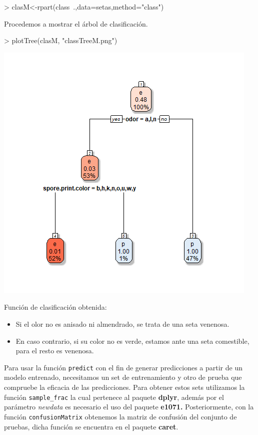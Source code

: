 \documentclass [a4paper] {article}
\begin{document}
\bigskip
\begin{Schunk}
\begin{Sinput}
> clasM<-rpart(class~.,data=setas,method="class")
\end{Sinput}
\end{Schunk}

\bigskip
Procedemos a mostrar el árbol de clasificación.
\begin{Schunk}
\begin{Sinput}
> plotTree(clasM, "classTreeM.png")
\end{Sinput}
\end{Schunk}
\includegraphics[width=\textwidth]{classTreeM}

\bigskip
Función de clasificación obtenida:
\begin{itemize}
\item Si el olor no es anisado ni almendrado, se trata de una seta venenosa.
\item En caso contrario, si su color no es verde, estamos ante una seta comestible, para el resto es venenosa.
\end{itemize}

\bigskip
Para usar la función \texttt{predict} con el fin de generar predicciones a partir de un modelo entrenado, necesitamos
un set de entrenamiento y otro de prueba que compruebe la eficacia de las predicciones. Para obtener estos sets utilizamos
la función \texttt{sample\_frac} la cual pertenece al paquete \textbf{dplyr}, además por el parámetro \textit{newdata} es
necesario el uso del paquete \textbf{e1071.} Posteriormente, con la función \texttt{confusionMatrix} obtenemos la matriz de
confusión del conjunto de pruebas, dicha función se encuentra en el paquete \textbf{caret}.
\end{document}
